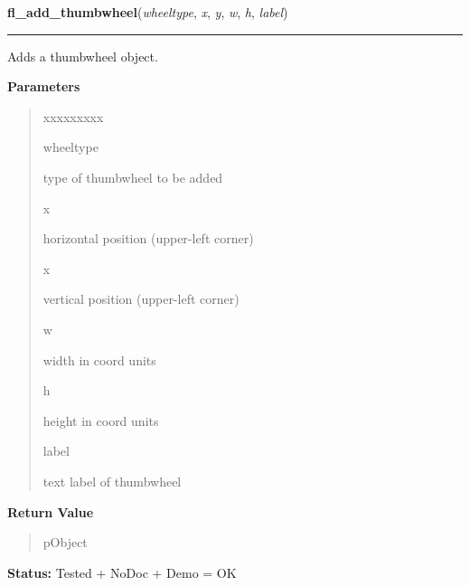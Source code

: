 \hspace{.8\funcindent}\begin{boxedminipage}{\funcwidth}

    \raggedright \textbf{fl\_add\_thumbwheel}(\textit{wheeltype}, \textit{x}, \textit{y}, \textit{w}, \textit{h}, \textit{label})

    \vspace{-1.5ex}

    \rule{\textwidth}{0.5\fboxrule}
\setlength{\parskip}{2ex}
    Adds a thumbwheel object.

\setlength{\parskip}{1ex}
      \textbf{Parameters}
      \vspace{-1ex}

      \begin{quote}
        \begin{Ventry}{xxxxxxxxx}

          \item[wheeltype]

          type of thumbwheel to be added

          \item[x]

          horizontal position (upper-left corner)

          \item[x]

          vertical position (upper-left corner)

          \item[w]

          width in coord units

          \item[h]

          height in coord units

          \item[label]

          text label of thumbwheel

        \end{Ventry}

      \end{quote}

      \textbf{Return Value}
    \vspace{-1ex}

      \begin{quote}
      pObject

      \end{quote}

\textbf{Status:} Tested + NoDoc + Demo = OK



    \end{boxedminipage}

